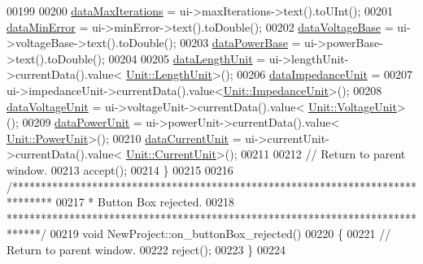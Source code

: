 \begin{DoxyCode}
00199 
00200   \hyperlink{class_new_project_a42e0ddd47dd58e3634ec274e7af00ba9}{dataMaxIterations} = ui->maxIterations->text().toUInt();
00201   \hyperlink{class_new_project_a186c2163239625faf8c7769a72fa988c}{dataMinError} = ui->minError->text().toDouble();
00202   \hyperlink{class_new_project_a21dc54f9c0c8a59ca33eaa42cb9f9352}{dataVoltageBase} = ui->voltageBase->text().toDouble();
00203   \hyperlink{class_new_project_a7a70270ca856001875a6043d5aa7a8af}{dataPowerBase} = ui->powerBase->text().toDouble();
00204 
00205   \hyperlink{class_new_project_ac0bf8b4f04f5c9425c74dd980711f021}{dataLengthUnit} = ui->lengthUnit->currentData().value<
      \hyperlink{class_unit_a8c8921f7b225ad6063b1cb573425b9a0}{Unit::LengthUnit}>();
00206   \hyperlink{class_new_project_ae50ce899e9b67db0001a11044730a778}{dataImpedanceUnit} =
00207     ui->impedanceUnit->currentData().value<\hyperlink{class_unit_a3747e779c805df24a71961290be3fbdf}{Unit::ImpedanceUnit}>();
00208   \hyperlink{class_new_project_a04187cd16b01b80dcdef9107e4c83a28}{dataVoltageUnit} = ui->voltageUnit->currentData().value<
      \hyperlink{class_unit_a55b07dfa9457e1eca2c7194fe0cfc3c1}{Unit::VoltageUnit}>();
00209   \hyperlink{class_new_project_a500a8b98942c5f4900348fd315fb9d8b}{dataPowerUnit} = ui->powerUnit->currentData().value<
      \hyperlink{class_unit_ace265ae255370ccacfd5370337572c3b}{Unit::PowerUnit}>();
00210   \hyperlink{class_new_project_a9d389065ff7f8588338069018088a20f}{dataCurrentUnit} = ui->currentUnit->currentData().value<
      \hyperlink{class_unit_a0794cf6c9682f48296dd4a5315389787}{Unit::CurrentUnit}>();
00211 
00212 \textcolor{comment}{// Return to parent window.}
00213   accept();
00214 \}
00215 
00216 \textcolor{comment}{/*******************************************************************************}
00217 \textcolor{comment}{ * Button Box rejected.}
00218 \textcolor{comment}{ ******************************************************************************/}
00219 \textcolor{keywordtype}{void} NewProject::on\_buttonBox\_rejected()
00220 \{
00221 \textcolor{comment}{// Return to parent window.}
00222   reject();
00223 \}
00224 
\end{DoxyCode}
